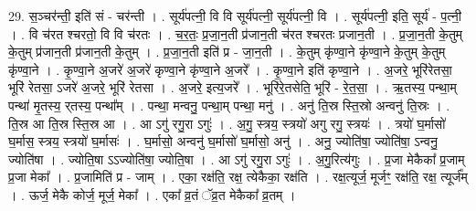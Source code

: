 \documentclass[17pt]{extarticle}
\begin{document}
29. स॒ञ्चर॑न्ती॒ इति॑ सं - चर॑न्ती । . सूर्य॑पत्नी॒ वि वि सूर्य॑पत्नी॒ सूर्य॑पत्नी॒ वि । . सूर्य॑पत्नी॒ इति॒ सूर्य॑ - प॒त्नी॒ । . वि च॑रत श्चरतो॒ वि वि च॑रतः । . च॒र॒तः॒ प्र॒जा॒न॒ती प्र॑जान॒ती च॑रत श्चरतः प्रजान॒ती । . प्र॒जा॒न॒ती के॒तुम् के॒तुम् प्र॑जान॒ती प्र॑जान॒ती के॒तुम् । . प्र॒जा॒न॒ती इति॑ प्र - जा॒न॒ती । . के॒तुम् कृ॑ण्वा॒ने कृ॑ण्वा॒ने के॒तुम् के॒तुम् कृ॑ण्वा॒ने । . कृ॒ण्वा॒ने अ॒जरे॑ अ॒जरे॑ कृण्वा॒ने कृ॑ण्वा॒ने अ॒जरे᳚ । . कृ॒ण्वा॒ने इति॑ कृण्वा॒ने । . अ॒जरे॒ भूरि॑रेतसा॒ भूरि॑ रेतसा॒ ऽजरे॑ अ॒जरे॒ भूरि॑ रेतसा । . अ॒जरे॒ इत्य॒जरे᳚ । . भूरि॑रे॒तसेति॒ भूरि॑ - रे॒त॒सा॒ । . ऋ॒तस्य॒ पन्था॒म् पन्था॑ मृ॒तस्य॒ र्‌तस्य॒ पन्था᳚म् । . पन्था॒ मन्वनु॒ पन्था॒म् पन्था॒ मनु॑ । . अनु॑ ति॒स्र स्ति॒स्रो अन्वनु॑ ति॒स्रः । . ति॒स्र आ ति॒स्र स्ति॒स्र आ । . आ ऽगु॑ रगु॒रा ऽगुः॑ । . अ॒गु॒ स्त्रय॒ स्त्रयो॑ अगु रगु॒ स्त्रयः॑ । . त्रयो॑ घ॒र्मासो॑ घ॒र्मास॒ स्त्रय॒ स्त्रयो॑ घ॒र्मासः॑ । . घ॒र्मासो॒ अन्वनु॑ घ॒र्मासो॑ घ॒र्मासो॒ अनु॑ । . अनु॒ ज्योति॑षा॒ ज्योति॑षा॒ ऽन्वनु॒ ज्योति॑षा । . ज्योति॒षा ऽऽज्योति॑षा॒ ज्योति॒षा । . आ ऽगु॑ रगु॒रा ऽगुः॑ । . अ॒गु॒रित्य॑गुः । . प्र॒जा मेकैका᳚ प्र॒जाम् प्र॒जा मेका᳚ । . प्र॒जामिति॑ प्र - जाम् । . एका॒ रक्ष॑ति॒ रक्ष॒ त्येकैका॒ रक्ष॑ति । . रक्ष॒त्यूर्ज॒ मूर्जꣳ॒॒ रक्ष॑ति॒ रक्ष॒ त्यूर्ज᳚म् । . ऊर्ज॒ मेकै कोर्ज॒ मूर्ज॒ मेका᳚ । . एका᳚ व्र॒तं ॅव्र॒त मेकैका᳚ व्र॒तम् । \newline
\end{document}
